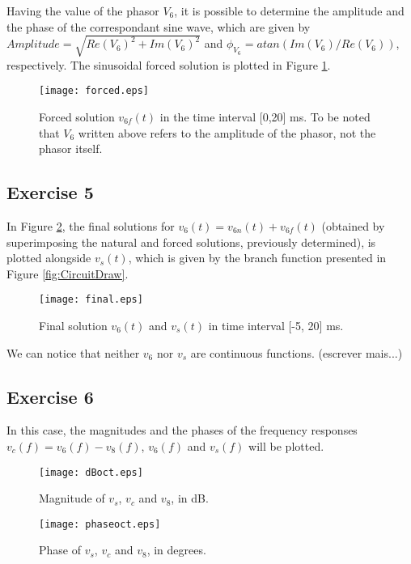 Having the value of the phasor $V_6$, it is possible to determine the amplitude and the phase of the correspondant sine wave, which are given by $Amplitude=\sqrt{Re(V_6)^2+Im(V_6)^2}$ and $\phi_{V_6}=atan(Im(V_6)/Re(V_6))$, respectively. The sinusoidal forced solution is plotted in Figure \ref{fig:ForcedSolutionGraph}.

\begin{figure}[H]
  \centering
  \texttt{[image: forced.eps]}
  \caption{Forced solution $v_{6f}(t)$ in the time interval [0,20] ms. To be noted that $V_6$ written above refers to the amplitude of the phasor, not the phasor itself.}
  \label{fig:ForcedSolutionGraph}
\end{figure}

\subsection{Exercise 5} \label{sec:Ex5Theo}

In Figure \ref{fig:final}, the final solutions for $v_6 (t)=v_{6n}(t)+v_{6f}(t)$ (obtained by superimposing the natural and forced solutions, previously determined), is plotted alongside $v_s(t)$, which is given by the branch function presented in Figure \ref{fig:CircuitDraw}.


\begin{figure}[H] \centering
  \texttt{[image: final.eps]}
  \caption{Final solution $v_6(t)$ and $v_s(t)$ in time interval [-5, 20] ms.}
  \label{fig:final}
\end{figure}

We can notice that neither $v_6$ nor $v_s$ are continuous functions. (escrever mais...)


\subsection{Exercise 6} \label{sec:Ex6Theo}

In this case, the magnitudes and the phases of the frequency responses $v_c(f)=v_6(f)-v_8(f)$, $v_6(f)$ and $v_s(f)$ will be plotted.

\begin{figure}[H] \centering
  \texttt{[image: dBoct.eps]}
  \caption{Magnitude of $v_s$, $v_c$ and $v_8$, in dB.}
  \label{fig:finaloct}
\end{figure}

\begin{figure}[H] \centering
  \texttt{[image: phaseoct.eps]}
  \caption{Phase of $v_s$, $v_c$ and $v_8$, in degrees.}
  \label{fig:finaloct}
\end{figure}

